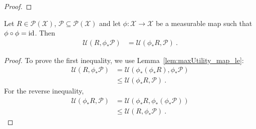 \begin{proof}\leanok

\end{proof}


\begin{lemma}\label{lem:maxUtility_map_swap}
  \leanok
Let $R \in \mathcal{P}(\mathcal{X})$, $\mathcal{P} \subseteq \mathcal{P}(\mathcal{X})$ and let $\phi : \mathcal{X} \to \mathcal{X}$ be a measurable map such that $\phi \circ \phi = \operatorname{id}$.
Then
\begin{align*}
  \mathcal{U}(R, \phi_* \mathcal{P})
  &= \mathcal{U}(\phi_* R, \mathcal{P})
  \: .
\end{align*}
\end{lemma}

\begin{proof}\leanok
To prove the first inequality, we use Lemma~\ref{lem:maxUtility_map_le}:
\begin{align*}
  \mathcal{U}(R, \phi_* \mathcal{P})
  &= \mathcal{U}(\phi_* (\phi_* R), \phi_* \mathcal{P})
  \\
  &\le \mathcal{U}(\phi_* R, \mathcal{P})
  \: .
\end{align*}
For the reverse inequality,
\begin{align*}
  \mathcal{U}(\phi_* R, \mathcal{P})
  &= \mathcal{U}(\phi_* R, \phi_* (\phi_* \mathcal{P}))
  \\
  &\le \mathcal{U}(R, \phi_* \mathcal{P})
  \: .
\end{align*}
\end{proof}
